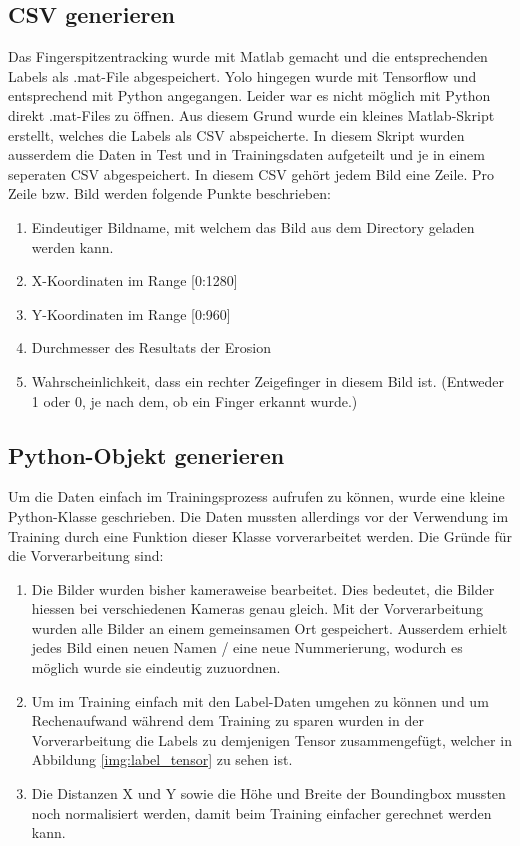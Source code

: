 \subsection{CSV generieren}
Das Fingerspitzentracking wurde mit Matlab gemacht und die entsprechenden Labels als .mat-File abgespeichert.
Yolo hingegen wurde mit Tensorflow und entsprechend mit Python angegangen. 
Leider war es nicht möglich mit Python direkt .mat-Files zu öffnen. 
Aus diesem Grund wurde ein kleines Matlab-Skript erstellt, welches die Labels als CSV abspeicherte. 
In diesem Skript wurden ausserdem die Daten in Test und in Trainingsdaten aufgeteilt und je in einem seperaten CSV abgespeichert.
In diesem CSV gehört jedem Bild eine Zeile. 
Pro Zeile bzw. Bild werden folgende Punkte beschrieben:
\begin{enumerate}
\item Eindeutiger Bildname, mit welchem das Bild aus dem Directory geladen werden kann. 
\item X-Koordinaten im Range [0:1280]
\item Y-Koordinaten im Range [0:960]
\item Durchmesser des Resultats der Erosion
\item Wahrscheinlichkeit, dass ein rechter Zeigefinger in diesem Bild ist. 
(Entweder 1 oder 0, je nach dem, ob ein Finger erkannt wurde.)
\end{enumerate}


\subsection{Python-Objekt generieren}
Um die Daten einfach im Trainingsprozess aufrufen zu können, wurde eine kleine Python-Klasse geschrieben.
Die Daten mussten allerdings vor der Verwendung im Training durch eine Funktion dieser Klasse vorverarbeitet werden.
Die Gründe für die Vorverarbeitung sind: 
\begin{enumerate}
\item Die Bilder wurden bisher kameraweise bearbeitet.
Dies bedeutet, die Bilder hiessen bei verschiedenen Kameras genau gleich.
Mit der Vorverarbeitung wurden alle Bilder an einem gemeinsamen Ort gespeichert.
Ausserdem erhielt jedes Bild einen neuen Namen / eine neue Nummerierung, wodurch es möglich wurde sie eindeutig zuzuordnen. 
\item Um im Training einfach mit den Label-Daten umgehen zu können und um Rechenaufwand während dem Training zu sparen wurden in der Vorverarbeitung die Labels zu demjenigen Tensor zusammengefügt, welcher in Abbildung \ref{img:label_tensor} zu sehen ist.
\item Die Distanzen X und Y sowie die Höhe und Breite der Boundingbox mussten noch normalisiert werden, damit beim Training einfacher gerechnet werden kann.
\end{enumerate}
